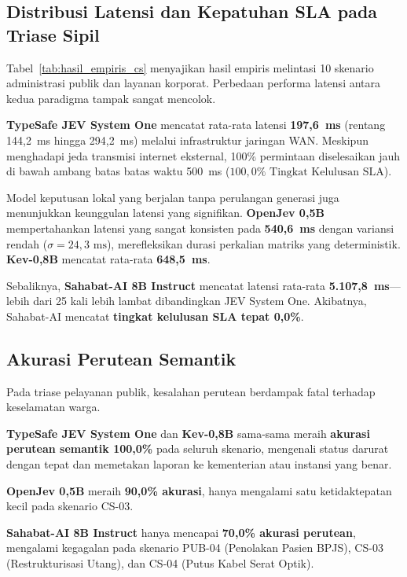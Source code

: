 \documentclass[journal,compsoc]{IEEEtran}
\begin{document}
\subsection{Distribusi Latensi dan Kepatuhan SLA pada Triase Sipil}
Tabel~\ref{tab:hasil_empiris_cs} menyajikan hasil empiris melintasi 10 skenario administrasi publik dan layanan korporat. Perbedaan performa latensi antara kedua paradigma tampak sangat mencolok.

\textbf{TypeSafe JEV System One} mencatat rata-rata latensi \textbf{197,6~ms} (rentang 144,2~ms hingga 294,2~ms) melalui infrastruktur jaringan WAN. Meskipun menghadapi jeda transmisi internet eksternal, 100\% permintaan diselesaikan jauh di bawah ambang batas batas waktu 500~ms ($100{,}0\% \text{ Tingkat Kelulusan SLA}$).

Model keputusan lokal yang berjalan tanpa perulangan generasi juga menunjukkan keunggulan latensi yang signifikan. \textbf{OpenJev 0,5B} mempertahankan latensi yang sangat konsisten pada \textbf{540,6~ms} dengan variansi rendah ($\sigma = 24{,}3 \text{ ms}$), merefleksikan durasi perkalian matriks yang deterministik. \textbf{Kev-0,8B} mencatat rata-rata \textbf{648,5~ms}.

Sebaliknya, \textbf{Sahabat-AI 8B Instruct} mencatat latensi rata-rata \textbf{5.107,8~ms}—lebih dari 25 kali lebih lambat dibandingkan JEV System One. Akibatnya, Sahabat-AI mencatat \textbf{tingkat kelulusan SLA tepat 0,0\%}.

\subsection{Akurasi Perutean Semantik}
Pada triase pelayanan publik, kesalahan perutean berdampak fatal terhadap keselamatan warga.

\textbf{TypeSafe JEV System One} dan \textbf{Kev-0,8B} sama-sama meraih \textbf{akurasi perutean semantik 100,0\%} pada seluruh skenario, mengenali status darurat dengan tepat dan memetakan laporan ke kementerian atau instansi yang benar.

\textbf{OpenJev 0,5B} meraih \textbf{90,0\% akurasi}, hanya mengalami satu ketidaktepatan kecil pada skenario CS-03.

\textbf{Sahabat-AI 8B Instruct} hanya mencapai \textbf{70,0\% akurasi perutean}, mengalami kegagalan pada skenario PUB-04 (Penolakan Pasien BPJS), CS-03 (Restrukturisasi Utang), dan CS-04 (Putus Kabel Serat Optik).
\end{document}
